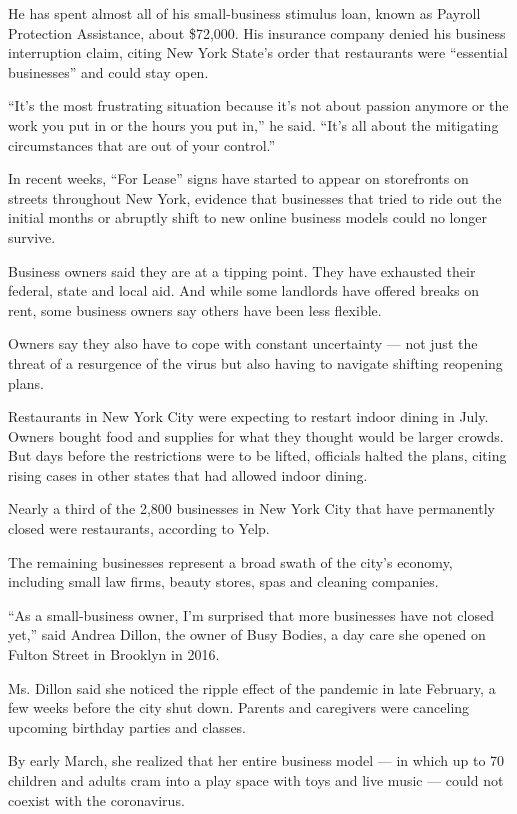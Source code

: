 He has spent almost all of his small-business stimulus loan, known as
Payroll Protection Assistance, about \$72,000. His insurance company
denied his business interruption claim, citing New York State's order
that restaurants were ``essential businesses'' and could stay open.

``It's the most frustrating situation because it's not about passion
anymore or the work you put in or the hours you put in,'' he said.
``It's all about the mitigating circumstances that are out of your
control.''

In recent weeks, ``For Lease'' signs have started to appear on
storefronts on streets throughout New York, evidence that businesses
that tried to ride out the initial months or abruptly shift to new
online business models could no longer survive.

Business owners said they are at a tipping point. They have exhausted
their federal, state and local aid. And while some landlords have
offered breaks on rent, some business owners say others have been less
flexible.

Owners say they also have to cope with constant uncertainty --- not just
the threat of a resurgence of the virus but also having to navigate
shifting reopening plans.

Restaurants in New York City were expecting to restart indoor dining in
July. Owners bought food and supplies for what they thought would be
larger crowds. But days before the restrictions were to be lifted,
officials halted the plans, citing rising cases in other states that had
allowed indoor dining.

Nearly a third of the 2,800 businesses in New York City that have
permanently closed were restaurants, according to Yelp.

The remaining businesses represent a broad swath of the city's economy,
including small law firms, beauty stores, spas and cleaning companies.

``As a small-business owner, I'm surprised that more businesses have not
closed yet,'' said Andrea Dillon, the owner of Busy Bodies, a day care
she opened on Fulton Street in Brooklyn in 2016.

Ms. Dillon said she noticed the ripple effect of the pandemic in late
February, a few weeks before the city shut down. Parents and caregivers
were canceling upcoming birthday parties and classes.

By early March, she realized that her entire business model --- in which
up to 70 children and adults cram into a play space with toys and live
music --- could not coexist with the coronavirus.


